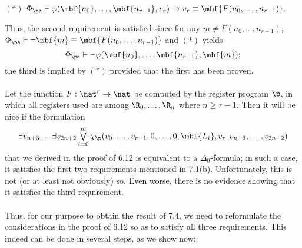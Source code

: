 \begin{center}
$(*)$ \hfill $\Phi_\pa \vdash \varphi(\mbf{n_0}, \ldots, \mbf{n_{r - 1}}, v_r) \rightarrow v_r \equiv \mbf{F(n_0, \ldots, n_{r - 1})}.$ \hfill \phantom{$(*)$}
\end{center}
Thus, the second requirement is satisfied since for any $m \neq F(n_0, \ldots, n_{r - 1})$, $\Phi_\pa \vdash \neg \mbf{m} \equiv \mbf{F(n_0, \ldots, n_{r - 1})}$ and $(*)$ yields
\[
\Phi_\pa \vdash \neg\varphi(\mbf{n_0}, \ldots, \mbf{n_{r - 1}}, \mbf{m});
\]
the third is implied by $(*)$ provided that the first has been proven.\\
\ \\
Let the function $F : \nat^r \to \nat$ be computed by the register program $\p$, in which all registers used are among $\R_0, \ldots, \R_n$ where $n \geq r - 1$. Then it will be nice if the formulation
\[
\exists v_{n + 3} \ldots \exists v_{2n + 2} \textstyle\bigvee\limits^m_{i = 0} \chi_\p (v_0, \ldots, v_{r - 1}, 0, \ldots, 0, \mbf{L_i}, v_r, v_{n + 3}, \ldots, v_{2n + 2})
\]
that we derived in the proof of 6.12 is equivalent to a $\Delta_0$-formula; in such a case, it satisfies the first two requirements mentioned in 7.1(b). Unfortunately, this is not (or at least not obviously) so. Even worse, there is no evidence showing that it satisfies the third requirement.\\
\ \\
Thus, for our purpose to obtain the result of 7.4, we need to reformulate the considerations in the proof of 6.12 so as to satisfy all three requirements. This indeed can be done in several steps, as we show now:
